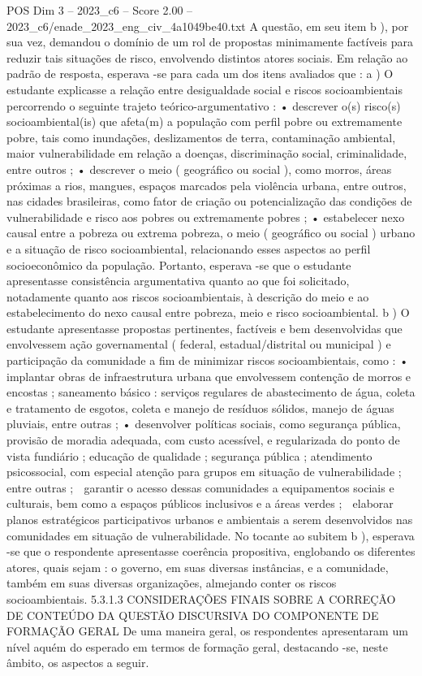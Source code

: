 \begin{textsample}{POS Dim 3 – 2023\_c6 – Score 2.00 – 2023\_c6/enade\_2023\_eng\_civ\_4a1049be40.txt}
A questão, em seu item b ), por sua vez, demandou o domínio de um rol de propostas minimamente factíveis para reduzir tais situações de risco, envolvendo distintos atores sociais.
Em relação ao padrão de resposta, esperava -se para cada um dos itens avaliados que : a ) O estudante explicasse a relação entre desigualdade social e riscos socioambientais percorrendo o seguinte trajeto teórico-argumentativo : • descrever o(s) risco(s) socioambiental(is) que afeta(m) a população com perfil pobre ou extremamente pobre, tais como inundações, deslizamentos de terra, contaminação ambiental, maior vulnerabilidade em relação a doenças, discriminação social, criminalidade, entre outros ; • descrever o meio ( geográfico ou social ), como morros, áreas próximas a rios, mangues, espaços marcados pela violência urbana, entre outros, nas cidades brasileiras, como fator de criação ou potencialização das condições de vulnerabilidade e risco aos pobres ou extremamente pobres ; • estabelecer nexo causal entre a pobreza ou extrema pobreza, o meio ( geográfico ou social ) urbano e a situação de risco socioambiental, relacionando esses aspectos ao perfil socioeconômico da população.
Portanto, esperava -se que o estudante apresentasse consistência argumentativa quanto ao que foi solicitado, notadamente quanto aos riscos socioambientais, à descrição do meio e ao estabelecimento do nexo causal entre pobreza, meio e risco socioambiental. b ) O estudante apresentasse propostas pertinentes, factíveis e bem desenvolvidas que envolvessem ação governamental ( federal, estadual/distrital ou municipal ) e participação da comunidade a fim de minimizar riscos socioambientais, como : • implantar obras de infraestrutura urbana que envolvessem contenção de morros e encostas ; saneamento básico : serviços regulares de abastecimento de água, coleta e tratamento de esgotos, coleta e manejo de resíduos sólidos, manejo de águas pluviais, entre outras ; • desenvolver políticas sociais, como segurança pública, provisão de moradia adequada, com custo acessível, e regularizada do ponto de vista fundiário ; educação de qualidade ; segurança pública ; atendimento psicossocial, com especial atenção para grupos em situação de vulnerabilidade ; entre outras ;  garantir o acesso dessas comunidades a equipamentos sociais e culturais, bem como a espaços públicos inclusivos e a áreas verdes ;  elaborar planos estratégicos participativos urbanos e ambientais a serem desenvolvidos nas comunidades em situação de vulnerabilidade.
No tocante ao subitem b ), esperava -se que o respondente apresentasse coerência propositiva, englobando os diferentes atores, quais sejam : o governo, em suas diversas instâncias, e a comunidade, também em suas diversas organizações, almejando conter os riscos socioambientais. 5.3.1.3 CONSIDERAÇÕES FINAIS SOBRE A CORREÇÃO DE CONTEÚDO DA QUESTÃO DISCURSIVA DO COMPONENTE DE FORMAÇÃO GERAL De uma maneira geral, os respondentes apresentaram um nível aquém do esperado em termos de formação geral, destacando -se, neste âmbito, os aspectos a seguir.

\end{textsample}

